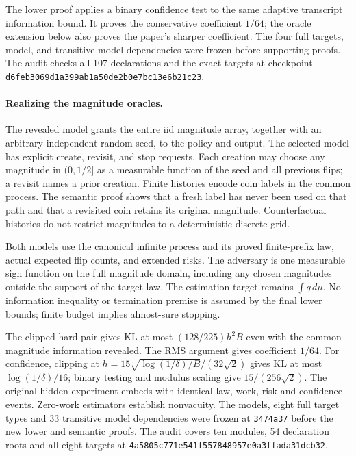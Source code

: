 The lower proof applies a binary confidence test to the same adaptive
transcript information bound. It proves the conservative coefficient
$1/64$; the oracle extension below also proves the paper's sharper
coefficient. The four full targets, model, and transitive model
dependencies were frozen before supporting proofs. The audit checks
all 107 declarations and the exact targets at checkpoint
\nolinkurl{d6feb3069d1a399ab1a50de2b0e7bc13e6b21c23}.

\paragraph{Realizing the magnitude oracles.}
The revealed model grants the entire iid magnitude array, together with an
arbitrary independent random seed, to the policy and output. The selected
model has explicit create, revisit, and stop requests. Each creation may
choose any magnitude in $(0,1/2]$ as a measurable function of the seed and
all previous flips; a revisit names a prior creation. Finite histories
encode coin labels in the common process. The semantic proof shows that
a fresh label has never been used on that path and that a revisited coin
retains its original magnitude. Counterfactual histories do not restrict
magnitudes to a deterministic discrete grid.

Both models use the canonical infinite process and its proved finite-prefix
law, actual expected flip counts, and extended risks. The adversary is one
measurable sign function on the full magnitude domain, including any chosen
magnitudes outside the support of the target law. The estimation target
remains $\int q\,d\mu$. No information inequality or termination premise is
assumed by the final lower bounds; finite budget implies almost-sure stopping.

The clipped hard pair gives KL at most $(128/225)h^2B$ even with the common
magnitude information revealed. The RMS argument gives coefficient $1/64$.
For confidence, clipping at
$h=15\sqrt{\log(1/\delta)/B}/(32\sqrt2)$ gives KL at most
$\log(1/\delta)/16$; binary testing and modulus scaling give
$15/(256\sqrt2)$. The original hidden experiment embeds with identical law,
work, risk and confidence events. Zero-work estimators establish nonvacuity.
The models, eight full target types and 33 transitive model dependencies
were frozen at \nolinkurl{3474a37} before the new lower and semantic proofs.
The audit covers ten modules, 54 declaration roots and all eight targets
at \nolinkurl{4a5805c771e541f557848957e0a3ffada31dcb32}.

